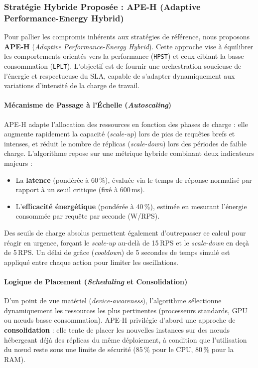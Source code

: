 \subsubsection{Stratégie Hybride Proposée : APE-H (Adaptive Performance-Energy Hybrid)}

Pour pallier les compromis inhérents aux stratégies de référence, nous proposons \textbf{APE-H} (\textit{Adaptive Performance-Energy Hybrid}). Cette approche vise à équilibrer les comportements orientés vers la performance (\texttt{HPST}) et ceux ciblant la basse consommation (\texttt{LPLT}). L'objectif est de fournir une orchestration soucieuse de l'énergie et respectueuse du SLA, capable de s'adapter dynamiquement aux variations d'intensité de la charge de travail.

\paragraph{Mécanisme de Passage à l'Échelle (\textit{Autoscaling})}

APE-H adapte l'allocation des ressources en fonction des phases de charge : elle augmente rapidement la capacité (\textit{scale-up}) lors de pics de requêtes brefs et intenses, et réduit le nombre de réplicas (\textit{scale-down}) lors des périodes de faible charge. L'algorithme repose sur une métrique hybride combinant deux indicateurs majeurs :
\begin{itemize}
    \item La \textbf{latence} (pondérée à 60\,\%), évaluée via le temps de réponse normalisé par rapport à un seuil critique (fixé à 600\,ms).
    \item L'\textbf{efficacité énergétique} (pondérée à 40\,\%), estimée en mesurant l'énergie consommée par requête par seconde (W/RPS).
\end{itemize}

Des seuils de charge absolus permettent également d'outrepasser ce calcul pour réagir en urgence, forçant le \textit{scale-up} au-delà de 15\,RPS et le \textit{scale-down} en deçà de 5\,RPS. Un délai de grâce (\textit{cooldown}) de 5 secondes de temps simulé est appliqué entre chaque action pour limiter les oscillations.

\paragraph{Logique de Placement (\textit{Scheduling} et Consolidation)}

D'un point de vue matériel (\textit{device-awareness}), l'algorithme sélectionne dynamiquement les ressources les plus pertinentes (processeurs standards, GPU ou nœuds basse consommation). APE-H privilégie d'abord une approche de \textbf{consolidation} : elle tente de placer les nouvelles instances sur des nœuds hébergeant déjà des réplicas du même déploiement, à condition que l'utilisation du nœud reste sous une limite de sécurité (85\,\% pour le CPU, 80\,\% pour la RAM). 

